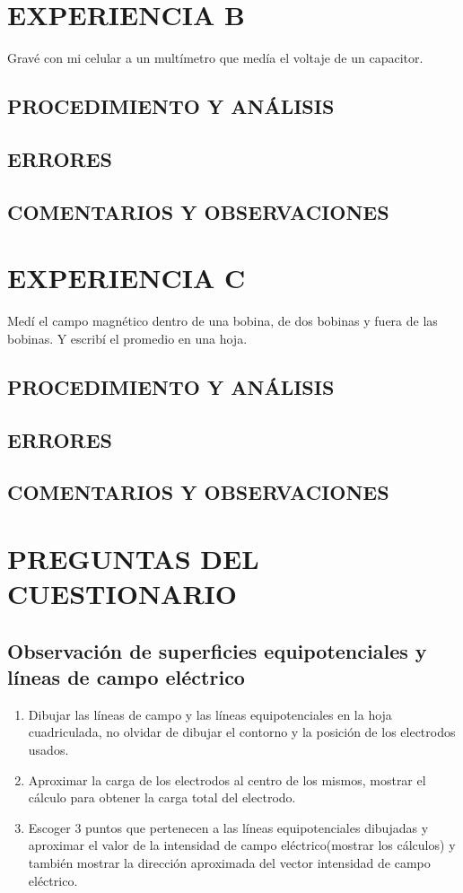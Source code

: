 \documentclass[10pt, twoside]{article}
\begin{document}
\section{EXPERIENCIA B}
Gravé con mi celular a un multímetro que medía el voltaje de un capacitor.

\subsection{PROCEDIMIENTO Y ANÁLISIS}%
\subsection{ERRORES}%
\subsection{COMENTARIOS Y OBSERVACIONES}%

\section{EXPERIENCIA C}
Medí el campo magnético dentro de una bobina, de dos bobinas y fuera de las bobinas.
Y escribí el promedio en una hoja.

\subsection{PROCEDIMIENTO Y ANÁLISIS}%
\subsection{ERRORES}%
\subsection{COMENTARIOS Y OBSERVACIONES}%

\section{PREGUNTAS DEL CUESTIONARIO}
\subsection{Observación de superficies equipotenciales y líneas de campo eléctrico}
\begin{enumerate}[label=\roman*.]
	\item Dibujar las líneas de campo y las líneas equipotenciales en la hoja cuadriculada,
		no olvidar de dibujar el contorno y la posición de los electrodos usados.
	\item Aproximar la carga de los electrodos al centro de los mismos,
		mostrar el cálculo para obtener la carga total del electrodo.
	\item Escoger 3 puntos que pertenecen a las líneas equipotenciales dibujadas y aproximar el valor
		de la intensidad de campo eléctrico(mostrar los cálculos)
		y también mostrar la dirección aproximada del vector intensidad de campo eléctrico.
\end{enumerate}
\end{document}
